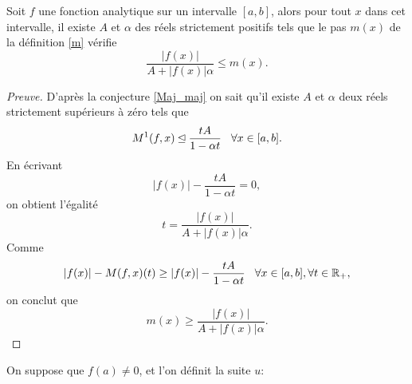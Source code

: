 \documentclass[a4paper,10pt]{article}
\begin{document}
	\begin{proposition}
		Soit $f$ une fonction analytique sur un intervalle $[a,b]$, alors pour tout $x$ dans cet intervalle, il existe $A$ et $\alpha$ des réels strictement positifs tels que le pas $m(x)$ de la définition \ref{m} vérifie
		\[\frac{|f(x)|}{A+|f(x)|\alpha}\leq m(x).\]
		\label{minor}
	\end{proposition}
	
	\begin{proof}[Preuve]
		D'après la conjecture \ref{Maj_maj} on sait qu'il existe $A$ et $\alpha$ deux réels strictement supérieurs à zéro tels que 
		\[M^1(f,x)\unlhd \frac{tA}{1-\alpha t} \hspace{3mm} \forall x \in [a,b].\]
		En écrivant 
		\[|f(x)|-\frac{tA}{1-\alpha t}=0,\]
		on obtient l'égalité
		\[t=\frac{|f(x)|}{A+|f(x)|\alpha}.\]
		Comme 
		\[|f(x)|- M(f,x)(t)\geq |f(x)|-\frac{tA}{1-\alpha t} \hspace{3mm} \forall x \in [a,b], \forall t \in \mathbb{R}_+,\]
		on conclut que 
		\[m(x)\geq \frac{|f(x)|}{A+|f(x)|\alpha}.\]
	\end{proof}
	
	\noindent On suppose que $f(a) \neq 0$, et l'on définit la suite $u$:
	
\end{document}
